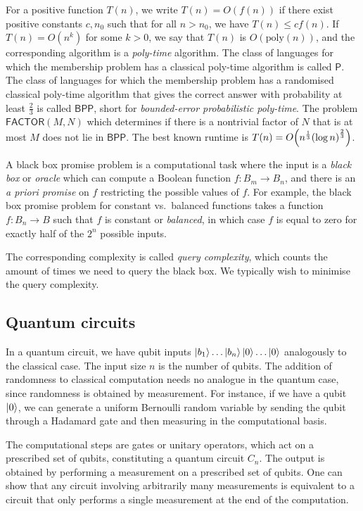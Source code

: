 For a positive function \( T(n) \), we write \( T(n) = O(f(n)) \) if there exist positive constants \( c, n_0 \) such that for all \( n > n_0 \), we have \( T(n) \leq cf(n) \).
If \( T(n) = O(n^k) \) for some \( k > 0 \), we say that \( T(n) \) is \( O(\mathrm{poly}(n)) \), and the corresponding algorithm is a \emph{poly-time} algorithm.
The class of languages for which the membership problem has a classical poly-time algorithm is called \( \mathsf{P} \).
The class of languages for which the membership problem has a randomised classical poly-time algorithm that gives the correct answer with probability at least \( \frac{2}{3} \) is called \( \mathsf{BPP} \), short for \emph{bounded-error probabilistic poly-time}.
The problem \( \mathsf{FACTOR}(M,N) \) which determines if there is a nontrivial factor of \( N \) that is at most \( M \) does not lie in \( \mathsf{BPP} \).
The best known runtime is \( T(n) = O\qty(n^{\frac{1}{3}}\qty(\log n)^\frac{2}{3}) \).

A black box promise problem is a computational task where the input is a \emph{black box} or \emph{oracle} which can compute a Boolean function \( f \colon B_m \to B_n \), and there is an \emph{a priori promise} on \( f \) restricting the possible values of \( f \).
For example, the black box promise problem for constant vs.\ balanced functions takes a function \( f \colon B_n \to B \) such that \( f \) is constant or \emph{balanced}, in which case \( f \) is equal to zero for exactly half of the \( 2^n \) possible inputs.

The corresponding complexity is called \emph{query complexity}, which counts the amount of times we need to query the black box.
We typically wish to minimise the query complexity.

\subsection{Quantum circuits}
In a quantum circuit, we have qubit inputs \( \ket{b_1} \dots \ket{b_n} \ket{0} \dots \ket{0} \) analogously to the classical case.
The input size \( n \) is the number of qubits.
The addition of randomness to classical computation needs no analogue in the quantum case, since randomness is obtained by measurement.
For instance, if we have a qubit \( \ket{0} \), we can generate a uniform Bernoulli random variable by sending the qubit through a Hadamard gate and then measuring in the computational basis.

The computational steps are gates or unitary operators, which act on a prescribed set of qubits, constituting a quantum circuit \( C_n \).
The output is obtained by performing a measurement on a prescribed set of qubits.
One can show that any circuit involving arbitrarily many measurements is equivalent to a circuit that only performs a single measurement at the end of the computation.

